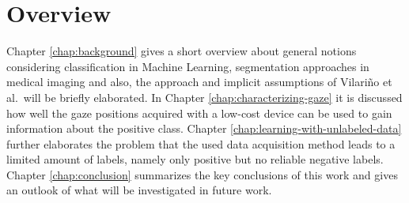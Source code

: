 \section{Overview}
Chapter \ref{chap:background} gives a short overview about general notions considering classification in Machine Learning, segmentation approaches in medical imaging and also, the approach and implicit assumptions of Vilari\~no et al.\ will be briefly elaborated. In Chapter \ref{chap:characterizing-gaze} it is discussed how well the gaze positions acquired with a low-cost device can be used to gain information about the positive class. Chapter \ref{chap:learning-with-unlabeled-data} further elaborates the problem that the used data acquisition method leads to a limited amount of labels, namely only positive but no reliable negative labels. 
Chapter \ref{chap:conclusion} summarizes the key conclusions of this work and gives an outlook of what will be investigated in future work.

